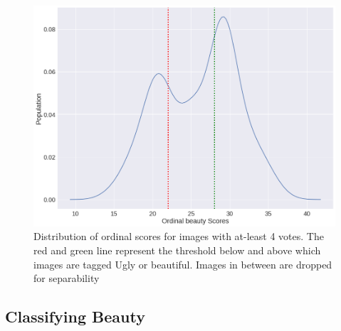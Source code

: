 \begin{figure}[ht]
	\centering
	\includegraphics[width=0.8\columnwidth]{Plot/Trueskill.png}
	\caption{Distribution of ordinal scores for images with at-least 4 votes. The red and green line represent the threshold below and above which images are tagged Ugly or beautiful. Images in between are dropped for separability }
	\label{fig:Trueskill}
\end{figure}



\subsection{Classifying Beauty}
